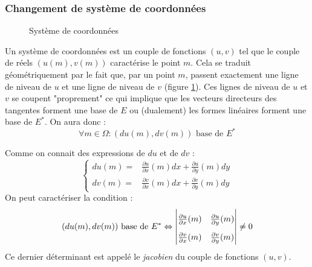 \subsubsection{Changement de système de coordonnées}
\begin{figure}[ht]
 \centering

\caption{Système de coordonnées}
\label{fig:C2268_4}
\end{figure}

Un système de coordonnées est un couple de fonctions $(u,v)$ tel que le couple de réels $(u(m),v(m))$ caractérise le point $m$. Cela se traduit géométriquement par le fait que, par un point $m$, passent exactement une ligne de niveau de $u$ et une ligne de niveau de $v$ (figure \ref{fig:C2268_4}). Ces lignes de niveau de $u$ et $v$ se coupent "proprement" ce qui implique que les vecteurs directeurs des tangentes forment une base de $E$ ou (dualement) les formes linéaires forment une base de $E^*$. On aura donc :
\begin{displaymath}
 \forall m\in \Omega :
(du(m),dv(m)) \text{ base de $E^*$}
\end{displaymath}
\begin{rem}
 Comme on connait des expressions de $du$ et de $dv$ :
\begin{displaymath}
 \left\lbrace 
\begin{aligned}
 du(m) =& \frac{\partial u}{\partial x}(m) dx + \frac{\partial u}{\partial y}(m) dy \\
 dv(m) =& \frac{\partial v}{\partial x}(m) dx + \frac{\partial v}{\partial y}(m) dy 
\end{aligned}
\right. 
\end{displaymath}
On peut caractériser la condition :
\begin{displaymath}
 (du(m),dv(m)) \text{ base de $E^*$} 
\Leftrightarrow
\renewcommand{\arraystretch}{1.8}
\begin{vmatrix}
\frac{\partial u}{\partial x}(m) & \frac{\partial u}{\partial y}(m) \\
\frac{\partial v}{\partial x}(m) & \frac{\partial v}{\partial y}(m)
\end{vmatrix}
\neq 0
\end{displaymath}
Ce dernier déterminant est appelé le \emph{jacobien} du couple de fonctions $(u,v)$.
\end{rem}


